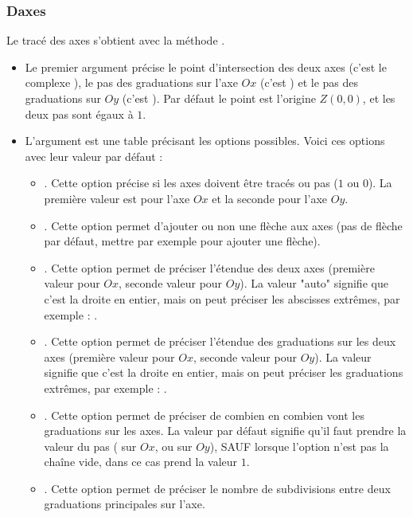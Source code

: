 \subsubsection{Daxes}
Le tracé des axes s'obtient avec la méthode .
\begin{itemize}
    \item Le premier argument précise le point d'intersection des deux axes (c'est le complexe ), le pas des graduations sur l'axe $Ox$ (c'est ) et le pas des graduations sur $Oy$ (c'est ). Par défaut le point  est l'origine $Z(0,0)$, et les deux pas sont égaux à $1$.
    \item L'argument  est une table précisant les options possibles. Voici ces options avec leur valeur par défaut :
        \begin{itemize}
            \item {}. Cette option précise si les axes doivent être tracés ou pas ($1$ ou $0$). La première valeur est pour l'axe $Ox$ et la seconde pour l'axe $Oy$.
            \item {}. Cette option permet d'ajouter ou non une flèche aux axes (pas de flèche par défaut, mettre  par exemple pour ajouter une flèche).
            \item {}. Cette option permet de préciser l'étendue des deux axes (première valeur pour $Ox$, seconde valeur pour $Oy$). La valeur "auto" signifie que c'est la droite en entier, mais on peut préciser les abscisses extrêmes, par exemple : .
            \item {}. Cette option permet de préciser l'étendue des graduations sur les deux axes (première valeur pour $Ox$, seconde valeur pour $Oy$). La valeur  signifie que c'est la droite en entier, mais on peut préciser les graduations extrêmes, par exemple : .
            \item {}. Cette option permet de préciser de combien en combien vont les graduations sur les axes. La valeur par défaut signifie qu'il faut prendre la valeur du pas ( sur $Ox$, ou  sur $Oy$), SAUF lorsque l'option  n'est pas la chaîne vide, dans ce cas  prend la valeur $1$.
            \item {}. Cette option permet de préciser le nombre de subdivisions entre deux graduations principales sur l'axe.

\end{itemize}
\end{itemize}
